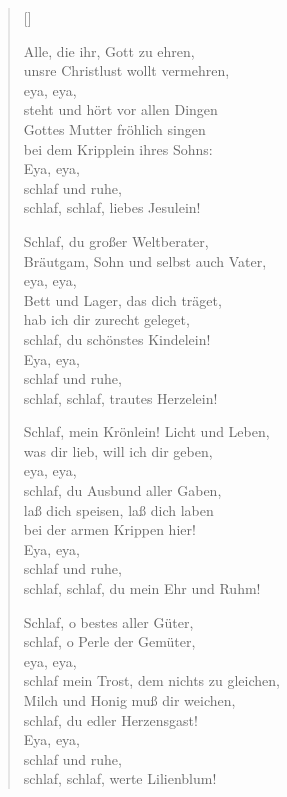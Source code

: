 \begin{multicols}{2}
\settowidth{\versewidth}{Schlaf, mein Krönlein! Licht und Leben,}
\begin{verse}[\versewidth]
 
 Alle, die ihr, Gott zu ehren,\\
unsre Christlust wollt vermehren,\\
eya, eya,\\
steht und hört vor allen Dingen\\
Gottes Mutter fröhlich singen\\
bei dem Kripplein ihres Sohns:\\
Eya, eya,\\
schlaf und ruhe,\\
schlaf, schlaf, liebes Jesulein!
 
 Schlaf, du großer Weltberater,\\
Bräutgam, Sohn und selbst auch Vater,\\
eya, eya,\\
Bett und Lager, das dich träget,\\
hab ich dir zurecht geleget,\\
schlaf, du schönstes Kindelein!\\
Eya, eya,\\
schlaf und ruhe,\\
schlaf, schlaf, trautes Herzelein!
 
 Schlaf, mein Krönlein! Licht und Leben,\\
was dir lieb, will ich dir geben,\\
eya, eya,\\
schlaf, du Ausbund aller Gaben,\\
laß dich speisen, laß dich laben\\
bei der armen Krippen hier!\\
Eya, eya,\\
schlaf und ruhe,\\
schlaf, schlaf, du mein Ehr und Ruhm!
 
 Schlaf, o bestes aller Güter,\\
schlaf, o Perle der Gemüter,\\
eya, eya,\\
schlaf mein Trost, dem nichts zu gleichen,\\
Milch und Honig muß dir weichen,\\
schlaf, du edler Herzensgast!\\
Eya, eya,\\
schlaf und ruhe,\\
schlaf, schlaf, werte Lilienblum!
 

\end{verse}
\end{multicols}
